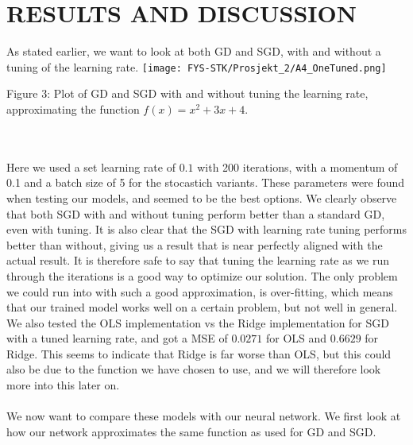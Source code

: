 \documentclass[english,notitlepage,reprint,nofootinbib]{revtex4-1}  %
\begin{document}
\section{RESULTS AND DISCUSSION}\label{sec:DISCUSSION}
As stated earlier, we want to look at both GD and SGD, with and without a tuning of the learning rate. 
\texttt{[image: FYS-STK/Prosjekt\_2/A4\_OneTuned.png]}
\caption{Figure 3: Plot of GD and SGD with and without tuning the learning rate, approximating the function $f(x) = x^2 + 3x + 4$.}
\\
\\
Here we used a set learning rate of $0.1$ with 200 iterations, with a momentum of 0.1 and a batch size of 5 for the stocastich variants. These parameters were found when testing our models, and seemed to be the best options. We clearly observe that both SGD with and without tuning perform better than a standard GD, even with tuning. It is also clear that the SGD with learning rate tuning performs better than without, giving us a result that is near perfectly aligned with the actual result. It is therefore safe to say that tuning the learning rate as we run through the iterations is a good way to optimize our solution. The only problem we could run into with such a good approximation, is over-fitting, which means that our trained model works well on a certain problem, but not well in general. We also tested the OLS implementation vs the Ridge implementation for SGD with a tuned learning rate, and got a MSE of $0.0271$ for OLS and $0.6629$ for Ridge. This seems to indicate that Ridge is far worse than OLS, but this could also be due to the function we have chosen to use, and we will therefore look more into this later on.
\\
\\
We now want to compare these models with our neural network. We first look at how our network approximates the same function as used for GD and SGD.
\end{document}
